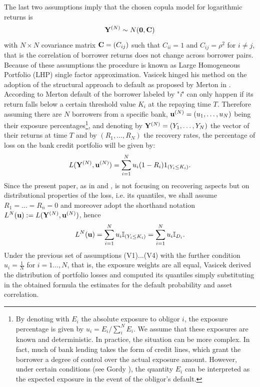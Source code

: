 \documentclass[preprint,12pt]{article}
\begin{document}
\noindent 
The last two assumptions imply that the chosen copula model for logarithmic returns is
\begin{equation}\label{gaussian1}
{\bf{Y}}^{(N)}\sim N({\bf{0}},{\bf{C}})
\end{equation}
with $N\times N$ covariance matrix ${\bf{C}}=(C_{ij})$ such that $C_{ii}=1$ and $C_{ij}=\rho^2$ for $i\neq j$, that is the correlation of borrower returns does not change across borrower pairs.\\
 Because of these assumptions the procedure is known as Large Homogeneous Portfolio (LHP) single factor approximation. Vasicek hinged his method on the adoption of the structural approach to default as proposed by Merton in \cite{mert}. According to Merton  default of the borrower labeled by "{\it{i}}\;" can only happen if its return falls below a certain threshold value $K_i$ at the repaying time $T$. Therefore assuming there are $N$ borrowers from a specific bank, ${\bf{u}}^{(N)}=(u_1,\ldots,u_N)$ being their exposure percentages\footnote{By denoting with $E_i$ the absolute exposure to obligor $i$, the exposure percentage is given by $u_i = E_i/\sum_{i}^N E_i$. We assume that these exposures are known and deterministic. In practice, the situation can be more complex. In fact, much of bank lending takes the form of credit lines, which grant the borrower a degree of control over the actual exposure amount. However, under certain conditions (see Gordy \cite{gordy}), the quantity $E_i$ can be interpreted as the expected exposure in the event of the obligor’s default.}, and denoting by ${\bf Y}^{(N)}=(Y_1,\ldots,Y_N)$ the vector of their returns at time $T$ and by $(R_1,\ldots,R_N)$ the recovery rates, the percentage of loss on the bank credit portfolio will be given by:
$$
L({\bf Y}^{(N)},{\bf{u}}^{(N)})=\sum_{i=1}^Nu_i(1-R_i) 1_{(Y_i\leq K_i)}.
$$
Since the present paper, as in \cite{vas1} and \cite{vas2}, is not focusing on recovering aspects but on distributional properties of the loss, i.e. its quantiles, we shall assume $R_1=\ldots=R_n=0$ and  moreover adopt the shorthand notation $L^N({\bf{u}}):=L({\bf{Y}}^{(N)},{\bf{u}}^{(N)})$, hence
\begin{equation}\label{loss}
L^N({\bf{u}}) = \sum_{i=1}^N u_i \mathbb{I}_{(Y_i\leq K_i)} = \sum_{i=1}^N u_i \mathbb{I}_{D_i}.
\end{equation}
Under the previous set of assumptions (V1)...(V4) with the further condition $u_i=\frac1{N}$ for $i=1\ldots,N$, that is, the exposure weights are all equal, Vasicek derived the distribution of portfolio losses and computed its quantiles simply substituting in the obtained formula the estimates for the default probability and asset correlation.\\
\end{document}
